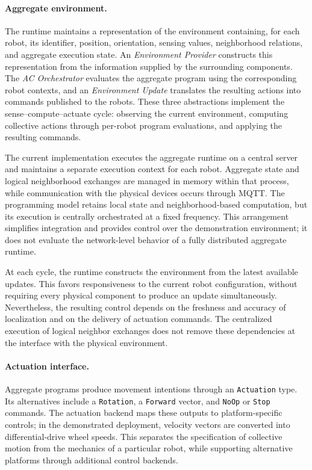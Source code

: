 \paragraph{Aggregate environment.}
The runtime maintains a representation of the environment containing,
 for each robot, its identifier, position, orientation, sensing values,
 neighborhood relations, and aggregate execution state.
%
An \emph{Environment Provider} constructs this representation from the
 information supplied by the surrounding components.
%
The \emph{AC Orchestrator} evaluates the aggregate program using the
 corresponding robot contexts, and an \emph{Environment Update} translates
 the resulting actions into commands published to the robots.
%
These three abstractions implement the sense--compute--actuate cycle:
 observing the current environment, computing collective actions through
 per-robot program evaluations, and applying the resulting commands.

The current implementation executes the aggregate runtime on a central
 server and maintains a separate execution context for each robot.
%
Aggregate state and logical neighborhood exchanges are managed in memory
 within that process, while communication with the physical devices occurs
 through MQTT.
%
The programming model retains local state and neighborhood-based
 computation, but its execution is centrally orchestrated at a fixed frequency.
%
This arrangement simplifies integration and provides control over the
 demonstration environment; it does not evaluate the network-level behavior
 of a fully distributed aggregate runtime.

At each cycle, the runtime constructs the environment from the latest
 available updates.
%
This favors responsiveness to the current robot configuration, without
 requiring every physical component to produce an update simultaneously.
%
Nevertheless, the resulting control depends on the freshness and accuracy
 of localization and on the delivery of actuation commands.
%
The centralized execution of logical neighbor exchanges does not remove
 these dependencies at the interface with the physical environment.

\paragraph{Actuation interface.}
Aggregate programs produce movement intentions through an
 \texttt{Actuation} type.
%
Its alternatives include a \texttt{Rotation}, a \texttt{Forward} vector,
 and \texttt{NoOp} or \texttt{Stop} commands.
%
The actuation backend maps these outputs to platform-specific controls;
 in the demonstrated deployment, velocity vectors are converted into
 differential-drive wheel speeds.
%
This separates the specification of collective motion from the mechanics
 of a particular robot, while supporting alternative platforms through
 additional control backends.

